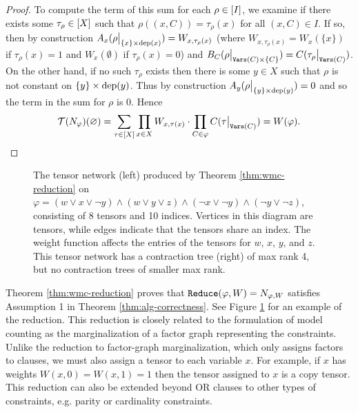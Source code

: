 \begin{proof}
To compute the term of this sum for each $\rho \in [I]$, we examine if there exists some $\tau_\rho \in [X]$ such that $\rho((x, C)) = \tau_\rho(x)$ for all $(x, C) \in I$. If so, then by construction $A_x(\rho\big|_{\{x\} \times \text{dep}(x)}) = W_{x, \tau_\rho(x)}$ (where $W_{x, \tau_\rho(x)} = W_x(\{x\})$ if $\tau_\rho(x)=1$ and $W_x(\emptyset)$ if $\tau_\rho(x)=0$) and $B_C(\rho\big|_{\texttt{\upshape Vars}(C) \times \{C\}}) = C(\tau_\rho\big|_{\texttt{\upshape Vars}(C)})$. On the other hand, if no such $\tau_\rho$ exists then there is some $y \in X$ such that $\rho$ is not constant on $\{y\} \times \text{dep}(y)$. Thus by construction $A_y(\rho\big|_{\{y\} \times \text{dep}(y)}) = 0$ and so the term in the sum for $\rho$ is 0. Hence
$$\mathcal{T}(N_\varphi)(\varnothing) = \sum_{\tau \in [X]} \prod_{x \in X} W_{x, \tau(x)} \cdot \prod_{C \in \varphi} C(\tau\big|_{\texttt{\upshape Vars}(C)}) = W(\varphi).$$
\end{proof}

\begin{figure}[t]
	\centering
	
	\hspace{1cm}
	
	\caption{\label{fig:wmc-example} The tensor network (left) produced by Theorem \ref{thm:wmc-reduction} on $\varphi = (w \lor x \lor \neg y) \land (w \lor y \lor z) \land (\neg x \lor \neg y) \land (\neg y \lor \neg z)$, consisting of 8 tensors and 10 indices. Vertices in this diagram are tensors, while edges indicate that the tensors share an index. The weight function affects the entries of the tensors for $w$, $x$, $y$, and $z$. This tensor network has a contraction tree (right) of max rank 4, but no contraction trees of smaller max rank.}
\end{figure}

Theorem \ref{thm:wmc-reduction} proves that $\texttt{\upshape Reduce}(\varphi,W) = N_{\varphi, W}$ satisfies Assumption 1 in Theorem \ref{thm:alg-correctness}. See Figure \ref{fig:wmc-example} for an example of the reduction. 
This reduction is closely related to the formulation of model counting as the marginalization of a factor graph representing the constraints. 
Unlike the reduction to factor-graph marginalization, which only assigns factors to clauses, we must also assign a tensor to each variable $x$. 
For example, if $x$ has weights $W(x, 0) = W(x,1) = 1$ then the tensor assigned to $x$ is a copy tensor.
This reduction can also be extended beyond OR clauses to other types of constraints, e.g. parity or cardinality constraints.

